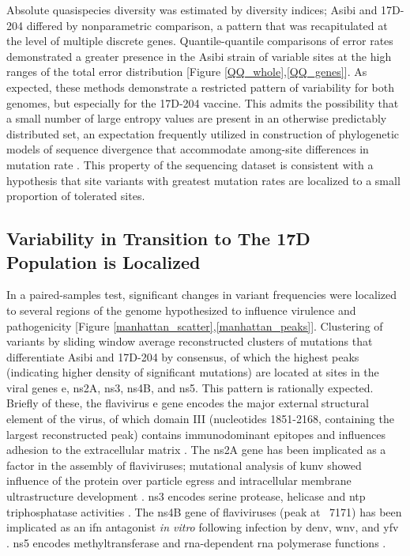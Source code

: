 Absolute quasispecies diversity was estimated by diversity indices; Asibi and 17D-204 differed by nonparametric comparison, a pattern that was recapitulated at the level of multiple discrete genes. Quantile-quantile comparisons of error rates demonstrated a greater presence in the Asibi strain of variable sites at the high ranges of the total error distribution [Figure \ref{QQ_whole},\ref{QQ_genes}]. As expected, these methods demonstrate a restricted pattern of variability for both genomes, but especially for the 17D-204 vaccine. This admits the possibility that a small number of large entropy values are present in an otherwise predictably distributed set, an expectation frequently utilized in construction of phylogenetic models of sequence divergence that accommodate among-site differences in mutation rate \parencite{Yang:1993wg}. This property of the sequencing dataset is consistent with a hypothesis that site variants with greatest mutation rates are localized to a small proportion of tolerated sites.

\subsection{Variability in Transition to The 17D Population is Localized}	
In a paired-samples test, significant changes in variant frequencies were localized to several regions of the genome hypothesized to influence virulence and pathogenicity [Figure \ref{manhattan_scatter},\ref{manhattan_peaks}]. Clustering of variants by sliding window average reconstructed clusters of mutations that differentiate Asibi and 17D-204 by consensus, of which the highest peaks (indicating higher density of significant mutations) are located at sites in the viral genes \gls{e}, \gls{ns}2A, \gls{ns}3, \gls{ns}4B, and \gls{ns}5. This pattern is rationally expected. Briefly of these, the flavivirus \gls{e} gene encodes the major external structural element of the virus, of which domain III (nucleotides 1851-2168, containing the largest reconstructed peak) contains immunodominant epitopes and influences adhesion to the extracellular matrix \parencite{Lee:2008gd,Sil:1992vsa}. The \gls{ns}2A gene has been implicated as a factor in the assembly of flaviviruses; mutational analysis of \gls{kunv} showed influence of the protein over particle egress and intracellular membrane ultrastructure development \parencite{Leung:2008cv}. \gls{ns}3 encodes serine protease, helicase and \gls{ntp} triphosphatase activities \parencite{Bera:2007bc,Luo:2008bg}. The \gls{ns}4B gene of flaviviruses (peak at ~7171) has been implicated as an \gls{ifn} antagonist \emph{in vitro} following infection by \gls{denv}, \gls{wnv}, and \gls{yfv} \parencite{MunozJordan:2005ia}. \gls{ns}5 encodes methyltransferase and \gls{rna}-dependent \gls{rna} polymerase functions \parencite{Zhou:2007bb,Zou:2011kt}.


